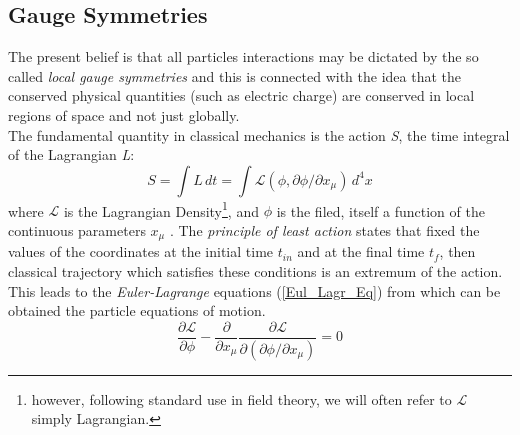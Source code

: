 \subsection{Gauge Symmetries}
\label{cap1:gaugeSymm}
The present belief is that all particles interactions may be dictated by the so called \textit{local gauge symmetries} and this is connected with the idea that  the conserved physical quantities (such as electric charge) are conserved in local regions of space and not just globally\cite{HalzenMartin}. \\
The fundamental quantity in classical mechanics is the action \textit{S}, the time integral of the Lagrangian \textit{L}:
\begin{equation}
S = \int L\, dt = \int \mathcal{L}(\phi, \partial \phi / \partial x_{\mu}) \,d^{4}x
\end{equation}
where $\mathcal{L}$ is the Lagrangian Density\footnote{however, following standard use in field theory, we will often refer to $\mathcal{L}$ simply Lagrangian.}, 
and $\phi$ is the filed, itself a function of the continuous parameters $x_{\mu}$ \cite{Peskin}\cite{Maggiore}.
The \textit{principle of least action} states that fixed the values of the coordinates at the initial time $t_{in}$ and at the final time $t_{f}$, then classical trajectory which satisfies these conditions is an extremum of the action. This leads to the \textit{Euler-Lagrange} equations (\ref{Eul_Lagr_Eq})
from which can be obtained the particle equations of motion.
\begin{equation}
\frac{\partial \mathcal{L}}{\partial \phi} - \frac{\partial}{\partial x_{\mu}}\frac{\partial \mathcal{L}}{\partial(\partial \phi / \partial x_{\mu})} = 0
\label{Eul_Lagr_Eq}
\end{equation}

